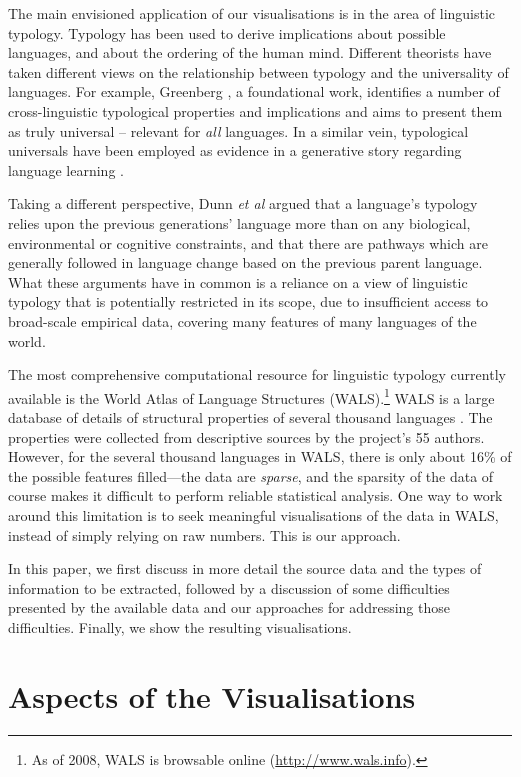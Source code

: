 \documentclass[11pt]{article}
\begin{document}
The main envisioned application of our visualisations is in the area of linguistic typology. Typology has been used to derive implications about possible languages, and about the ordering of the human mind. Different theorists have taken different views on the relationship between typology and the universality of languages. For example, Greenberg , a foundational work, identifies a number of cross-linguistic typological properties and implications and aims to present them as truly universal -- relevant for \textit{all} languages. In a similar vein, typological universals have been employed as evidence in a generative story regarding language learning \cite{chomsky}.

Taking a different perspective, Dunn {\it et al}  argued that a language's typology relies upon the previous generations' language more than on any biological, environmental or cognitive constraints, and that there are pathways which are generally followed in language change based on the previous parent language. What these arguments have in common is a reliance on a view of linguistic typology that is potentially restricted in its scope, due to insufficient access to broad-scale empirical data, covering many features of many languages of the world. 

The most comprehensive computational resource for linguistic typology currently available is the World Atlas of Language Structures (WALS).\footnote{As of 2008, WALS is browsable online (\url{http://www.wals.info}).}  WALS is a large database of details of structural properties of several thousand languages \cite{wals-2011}. The properties were collected from descriptive sources by the project's 55 authors. However, for the several thousand languages in WALS, there is only about 16\% of the possible features filled---the data are \emph{sparse}, and the sparsity of the data of course makes it difficult to perform reliable statistical analysis. One way to work around this limitation is to seek meaningful visualisations of the data in WALS, instead of simply relying on raw numbers. This is our approach. 

In this paper, we first discuss in more detail the source data and the types of information to be extracted, followed by a discussion of some difficulties presented by the available data and our approaches for addressing those difficulties. Finally, we show the resulting visualisations.

\section{Aspects of the Visualisations}
\end{document}
